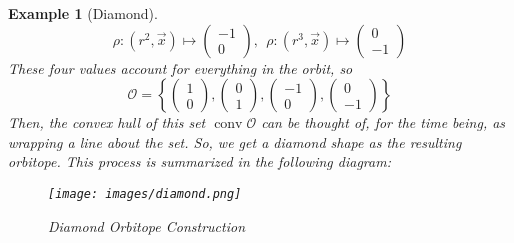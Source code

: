 \documentclass[12]{amsart}
\newtheorem{example}[theorem]{Example}
\newcommand{\orb}[0]{\mathcal{O}}
\newcommand{\set}[1]{ \left\{ #1 \right\} }
\newcommand{\vecxx}[2]{\begin{pmatrix} #1 \\ #2 \end{pmatrix}}
\DeclareMathOperator{\conv}{conv}
\begin{document}
\begin{example}[Diamond]
\begin{equation*}
		\rho: (r^2, \vec{x}) \mapsto 
		\begin{pmatrix} -1 \\ 0 \end{pmatrix},\ \ 
		\rho: (r^3, \vec{x}) \mapsto 
		\begin{pmatrix} 0 \\ -1 \end{pmatrix}	
	\end{equation*}
	These four values account for everything in the orbit, so
	$$\orb = \set{\vecxx{1}{0}, \vecxx{0}{1}, \vecxx{-1}{0}, \vecxx{0}{-1}}$$
	Then, the convex hull of this set $\conv{\orb}$ can be thought of, for the time being, as wrapping a line about the set. So, we get a diamond shape as the resulting orbitope. This process is summarized in the following diagram:
	\begin{figure}[h!]
		\texttt{[image: images/diamond.png]}
		\caption{Diamond Orbitope Construction}
		\label{fig:diamond}
	\end{figure}		
		\label{ex:diamond}
\end{example}
\end{document}

